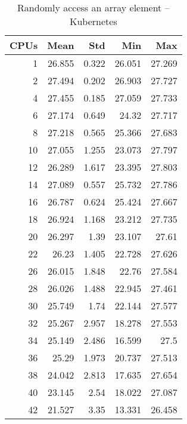 \begin{table}[htbp]
\begin{minipage}{.45\textwidth}
	\caption{Randomly access an array element -- bare metal}
	\label{tab:baremetal-random-access}
  \end{minipage}
  \hfill
  \begin{minipage}{.45\textwidth}
    \centering
    \scriptsize
\begin{tabular}{rrrrr}
\toprule
\textbf{CPUs} & \textbf{Mean} & \textbf{Std} & \textbf{Min} & \textbf{Max} \\
\midrule
1 & 26.855 & 0.322 & 26.051 & 27.269 \\
2 & 27.494 & 0.202 & 26.903 & 27.727 \\
4 & 27.455 & 0.185 & 27.059 & 27.733 \\
6 & 27.174 & 0.649 & 24.32 & 27.717 \\
8 & 27.218 & 0.565 & 25.366 & 27.683 \\
10 & 27.055 & 1.255 & 23.073 & 27.797 \\
12 & 26.289 & 1.617 & 23.395 & 27.803 \\
14 & 27.089 & 0.557 & 25.732 & 27.786 \\
16 & 26.787 & 0.624 & 25.424 & 27.667 \\
18 & 26.924 & 1.168 & 23.212 & 27.735 \\
20 & 26.297 & 1.39 & 23.107 & 27.61 \\
22 & 26.23 & 1.405 & 22.728 & 27.626 \\
26 & 26.015 & 1.848 & 22.76 & 27.584 \\
28 & 26.026 & 1.488 & 22.945 & 27.461 \\
30 & 25.749 & 1.74 & 22.144 & 27.577 \\
32 & 25.267 & 2.957 & 18.278 & 27.553 \\
34 & 25.149 & 2.486 & 16.599 & 27.5 \\
36 & 25.29 & 1.973 & 20.737 & 27.513 \\
38 & 24.042 & 2.813 & 17.635 & 27.654 \\
40 & 23.145 & 2.54 & 18.022 & 27.087 \\
42 & 21.527 & 3.35 & 13.331 & 26.458 \\
\bottomrule
\end{tabular}

	\caption{Randomly access an array element -- Kubernetes}
	\label{tab:kube-random-access}
  \end{minipage}
\end{table}

